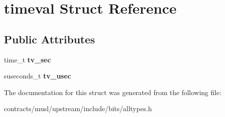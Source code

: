 \hypertarget{structtimeval}{}\section{timeval Struct Reference}
\label{structtimeval}
\subsection*{Public Attributes}
\begin{DoxyCompactItemize}
\item 
\mbox{\label{structtimeval_aef6ddab1064c430758f9f913b7e4a21e}} 
time\+\_\+t {\bfseries tv\+\_\+sec}
\item 
\mbox{\label{structtimeval_a810bf8fcd58e255a5c1896d19538b86a}} 
suseconds\+\_\+t {\bfseries tv\+\_\+usec}
\end{DoxyCompactItemize}


The documentation for this struct was generated from the following file\+:\begin{DoxyCompactItemize}
\item 
contracts/musl/upstream/include/bits/alltypes.\+h\end{DoxyCompactItemize}
